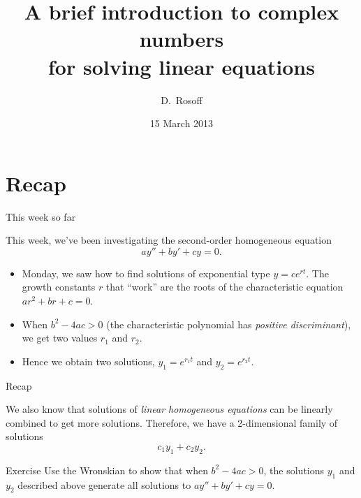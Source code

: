 \documentclass{beamer}
\title[Complex Numbers]{A brief introduction to complex numbers \\
for solving linear equations}
\author{D.\ Rosoff}
\institute{College of Idaho}
\date{15 March 2013}
\begin{document}
\begin{frame}
  \titlepage
\end{frame}


\section{Recap}

\begin{frame}{This week so far}

This week, we've been investigating the second-order homogeneous equation
\[
   ay'' + by' + cy = 0.
\]

\begin{itemize}
  \item Monday, we saw how to find solutions of exponential type $y = ce^{rt}$. The growth constants $r$ that ``work'' are the roots of the characteristic equation $ar^2 + br + c = 0$.
  \pause
  \item When $b^2 - 4ac > 0$ (the characteristic polynomial has \emph{positive discriminant}), we get two values $r_1$ and $r_2$. 
  \pause
  \item Hence we obtain two solutions, $y_1 = e^{r_1 t}$ and $y_2 = e^{r_2 t}$.
\end{itemize}

\end{frame}

\begin{frame}{Recap}

We also know that solutions of \emph{linear homogeneous equations} can be linearly combined to get more solutions. Therefore, we have a 2-dimensional family of solutions
\[
  c_1 y_1 + c_2 y_2.
\]

\begin{block}{Exercise}
Use the Wronskian to show that when $b^2 - 4ac > 0$, the solutions $y_1$ and $y_2$ described above generate all solutions to $ay'' + by' + cy = 0$.
\end{block}

\end{frame}
\end{document}
